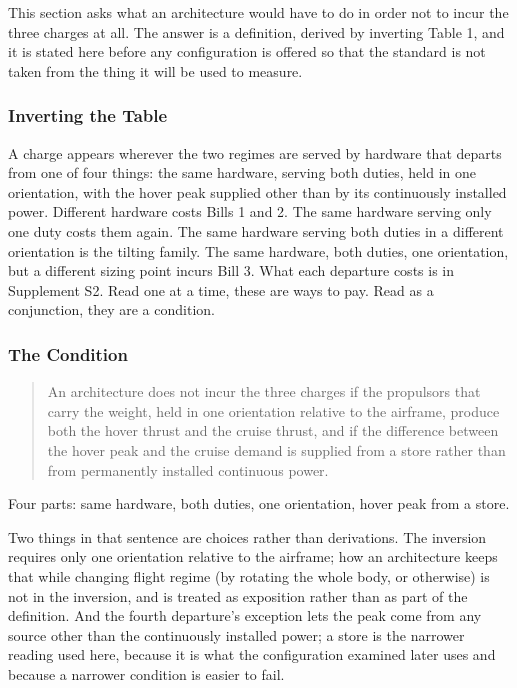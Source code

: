 \documentclass[journal]{new-aiaa}
\begin{document}
This section asks what an architecture would have to do in order not to incur the three charges at all. The answer is a definition, derived by inverting Table 1, and it is stated here before any configuration is offered so that the standard is not taken from the thing it will be used to measure.

\subsubsection{Inverting the Table}

A charge appears wherever the two regimes are served by hardware that departs from one of four things: the same hardware, serving both duties, held in one orientation, with the hover peak supplied other than by its continuously installed power. Different hardware costs Bills 1 and 2. The same hardware serving only one duty costs them again. The same hardware serving both duties in a different orientation is the tilting family. The same hardware, both duties, one orientation, but a different sizing point incurs Bill 3. What each departure costs is in Supplement S2. Read one at a time, these are ways to pay. Read as a conjunction, they are a condition.

\subsubsection{The Condition}

\begin{quote}
An architecture does not incur the three charges if the propulsors that carry the weight, held in one orientation relative to the airframe, produce both the hover thrust and the cruise thrust, and if the difference between the hover peak and the cruise demand is supplied from a store rather than from permanently installed continuous power.
\end{quote}

Four parts: same hardware, both duties, one orientation, hover peak from a store.

Two things in that sentence are choices rather than derivations. The inversion requires only one orientation relative to the airframe; how an architecture keeps that while changing flight regime (by rotating the whole body, or otherwise) is not in the inversion, and is treated as exposition rather than as part of the definition. And the fourth departure's exception lets the peak come from any source other than the continuously installed power; a store is the narrower reading used here, because it is what the configuration examined later uses and because a narrower condition is easier to fail.
\end{document}
